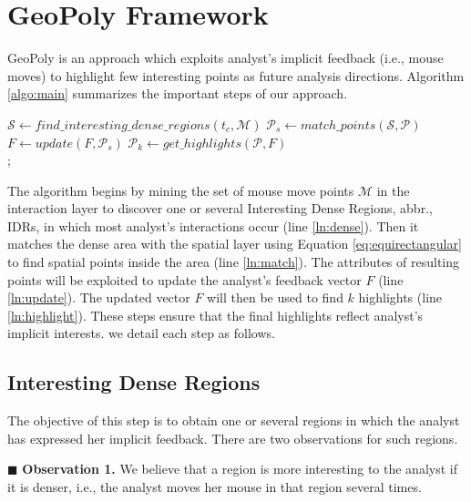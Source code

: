 \documentclass{vldb}
\begin{document}
\section{GeoPoly Framework}
\label{sec:algo}
{\sc GeoPoly} is an approach which exploits analyst's implicit feedback (i.e., mouse moves) to highlight few interesting points as future analysis directions. Algorithm \ref{algo:main} summarizes the important steps of our approach.

\begin{algorithm}[t]
\DontPrintSemicolon
{}
$\mathcal{S} \gets \mathit{find\_interesting\_dense\_regions}(t_c,\mathcal{M})$\label{ln:dense}\;
$\mathcal{P}_s \gets \mathit{match\_points}(\mathcal{S}, \mathcal{P})$\label{ln:match}\;
$F \gets \mathit{update}(F, \mathcal{P}_s)$\label{ln:update}\;
$\mathcal{P}_k \gets \mathit{get\_highlights}(\mathcal{P}, F)$\label{ln:highlight}\\;
\; 
\caption{{\sc GeoPoly} Algorithm}
\label{algo:main}
\end{algorithm}

\vspace{2pt}
The algorithm begins by mining the set of mouse move points $\mathcal{M}$ in the interaction layer to discover one or several Interesting Dense Regions, abbr., IDRs, in which most analyst's interactions occur (line \ref{ln:dense}). Then it matches the dense area with the spatial layer using Equation \ref{eq:equirectangular} to find spatial points inside the area (line \ref{ln:match}). The attributes of resulting points will be exploited to update the analyst's feedback vector $F$ (line \ref{ln:update}). The updated vector $F$ will then be used to find $k$ highlights (line \ref{ln:highlight}). These steps ensure that the final highlights reflect analyst's implicit interests. we detail each step as follows.

\subsection{Interesting Dense Regions}
The objective of this step is to obtain one or several regions in which the analyst has expressed her implicit feedback. There are two observations for such regions.

\vspace{2pt}
\noindent $\blacksquare$ {\bf Observation 1.} We believe that a region is more interesting to the analyst if it is denser, i.e., the analyst moves her mouse in that region several times.
\end{document}
